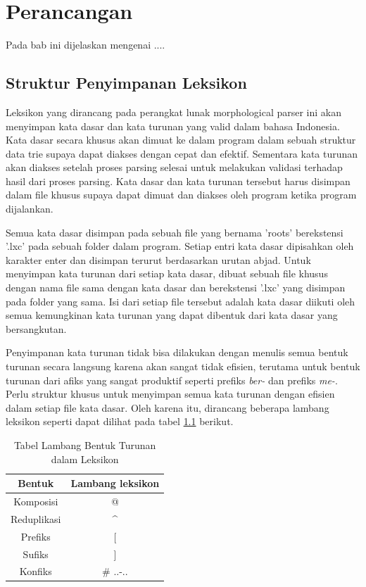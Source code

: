 \chapter{Perancangan}
\label{chap:perancangan}

Pada bab ini dijelaskan mengenai ....

\section{Struktur Penyimpanan Leksikon}
\label{sec:strukturPenyimpananLeksikon}

Leksikon yang dirancang pada perangkat lunak morphological parser ini akan menyimpan kata dasar dan kata turunan yang valid dalam bahasa Indonesia. Kata dasar secara khusus akan dimuat ke dalam program dalam sebuah struktur data trie supaya dapat diakses dengan cepat dan efektif. Sementara kata turunan akan diakses setelah proses parsing selesai untuk melakukan validasi terhadap hasil dari proses parsing. Kata dasar dan kata turunan tersebut harus disimpan dalam file khusus supaya dapat dimuat dan diakses oleh program ketika program dijalankan.

Semua kata dasar disimpan pada sebuah file yang bernama 'roots' berekstensi '.lxc' pada sebuah folder dalam program. Setiap entri kata dasar dipisahkan oleh karakter enter dan disimpan terurut berdasarkan urutan abjad. Untuk menyimpan kata turunan dari setiap kata dasar, dibuat sebuah file khusus dengan nama file sama dengan kata dasar dan berekstensi '.lxc' yang disimpan pada folder yang sama. Isi dari setiap file tersebut adalah kata dasar diikuti oleh semua kemungkinan kata turunan yang dapat dibentuk dari kata dasar yang bersangkutan.

Penyimpanan kata turunan tidak bisa dilakukan dengan menulis semua bentuk turunan secara langsung karena akan sangat tidak efisien, terutama untuk bentuk turunan dari afiks yang sangat produktif seperti prefiks \textit{ber-} dan prefiks \textit{me-}. Perlu struktur khusus untuk menyimpan semua kata turunan dengan efisien dalam setiap file kata dasar. Oleh karena itu, dirancang beberapa lambang leksikon seperti dapat dilihat pada tabel \ref{tabel-lambang-leksikon} berikut.

\begin{table}[H]
\centering
\begin{tabular}{|c|c|}
\hline
\textbf{Bentuk} & \textbf{Lambang leksikon} \\
\hline
Komposisi&@\\
Reduplikasi&\textasciicircum\\
Prefiks&[\\
Sufiks&]\\
Konfiks&\# ..-..\\
\hline
\end{tabular}
\caption{Tabel Lambang Bentuk Turunan dalam Leksikon} 
\label{tabel-lambang-leksikon}
\end{table}

